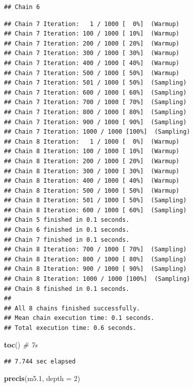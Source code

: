 \documentclass[
]{book}
\newenvironment{Shaded}{\begin{snugshade}}{\end{snugshade}}
\newcommand{\AttributeTok}[1]{\textcolor[rgb]{0.13,0.29,0.53}{#1}}
\newcommand{\CommentTok}[1]{\textcolor[rgb]{0.56,0.35,0.01}{\textit{#1}}}
\newcommand{\DecValTok}[1]{\textcolor[rgb]{0.00,0.00,0.81}{#1}}
\newcommand{\FloatTok}[1]{\textcolor[rgb]{0.00,0.00,0.81}{#1}}
\newcommand{\FunctionTok}[1]{\textcolor[rgb]{0.13,0.29,0.53}{\textbf{#1}}}
\newcommand{\NormalTok}[1]{#1}
\begin{document}
\begin{verbatim}
## Chain 6
\end{verbatim}

\begin{verbatim}
## Chain 7 Iteration:   1 / 1000 [  0%]  (Warmup) 
## Chain 7 Iteration: 100 / 1000 [ 10%]  (Warmup) 
## Chain 7 Iteration: 200 / 1000 [ 20%]  (Warmup) 
## Chain 7 Iteration: 300 / 1000 [ 30%]  (Warmup) 
## Chain 7 Iteration: 400 / 1000 [ 40%]  (Warmup) 
## Chain 7 Iteration: 500 / 1000 [ 50%]  (Warmup) 
## Chain 7 Iteration: 501 / 1000 [ 50%]  (Sampling) 
## Chain 7 Iteration: 600 / 1000 [ 60%]  (Sampling) 
## Chain 7 Iteration: 700 / 1000 [ 70%]  (Sampling) 
## Chain 7 Iteration: 800 / 1000 [ 80%]  (Sampling) 
## Chain 7 Iteration: 900 / 1000 [ 90%]  (Sampling) 
## Chain 7 Iteration: 1000 / 1000 [100%]  (Sampling) 
## Chain 8 Iteration:   1 / 1000 [  0%]  (Warmup) 
## Chain 8 Iteration: 100 / 1000 [ 10%]  (Warmup) 
## Chain 8 Iteration: 200 / 1000 [ 20%]  (Warmup) 
## Chain 8 Iteration: 300 / 1000 [ 30%]  (Warmup) 
## Chain 8 Iteration: 400 / 1000 [ 40%]  (Warmup) 
## Chain 8 Iteration: 500 / 1000 [ 50%]  (Warmup) 
## Chain 8 Iteration: 501 / 1000 [ 50%]  (Sampling) 
## Chain 8 Iteration: 600 / 1000 [ 60%]  (Sampling) 
## Chain 5 finished in 0.1 seconds.
## Chain 6 finished in 0.1 seconds.
## Chain 7 finished in 0.1 seconds.
## Chain 8 Iteration: 700 / 1000 [ 70%]  (Sampling) 
## Chain 8 Iteration: 800 / 1000 [ 80%]  (Sampling) 
## Chain 8 Iteration: 900 / 1000 [ 90%]  (Sampling) 
## Chain 8 Iteration: 1000 / 1000 [100%]  (Sampling) 
## Chain 8 finished in 0.1 seconds.
## 
## All 8 chains finished successfully.
## Mean chain execution time: 0.1 seconds.
## Total execution time: 0.6 seconds.
\end{verbatim}

\begin{Shaded}
\begin{Highlighting}[]
\FunctionTok{toc}\NormalTok{() }\CommentTok{\# 7s}
\end{Highlighting}
\end{Shaded}

\begin{verbatim}
## 7.744 sec elapsed
\end{verbatim}

\begin{Shaded}
\begin{Highlighting}[]
\FunctionTok{precis}\NormalTok{(m5}\FloatTok{.1}\NormalTok{, }\AttributeTok{depth =} \DecValTok{2}\NormalTok{)}
\end{Highlighting}
\end{Shaded}
\end{document}
